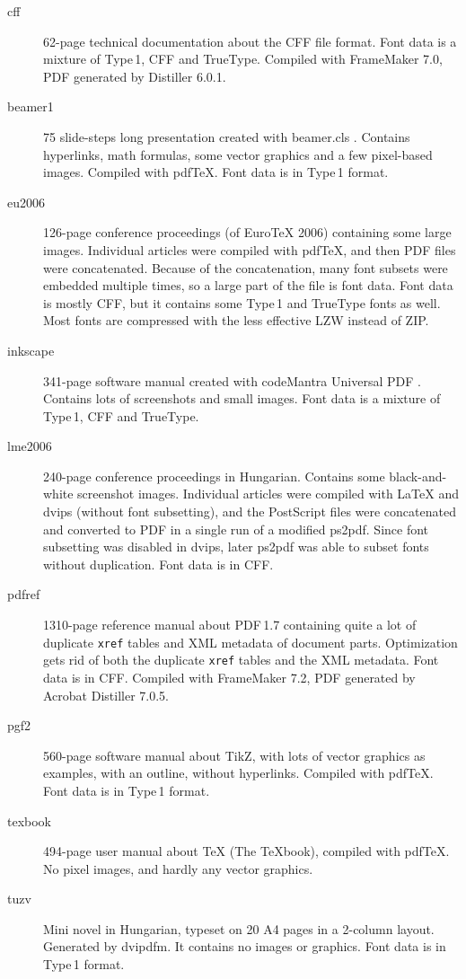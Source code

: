 \documentclass{ltugproc}
\def\cmd{\textsf}
\def\pkg{\textsf}
\begin{document}
\begin{description}

\item[cff] 62-page technical documentation about the CFF file format. Font
data is a mixture of Type\,1, CFF and TrueType. Compiled with Frame\-Maker
7.0, PDF generated by Distiller 6.0.1. 

\item[beamer1] 75 slide-steps long presentation created with
\pkg{beamer.cls} \cite{beamer}. Contains hyperlinks, math formulas, some
vector graphics and a few pixel-based images. Compiled with pdf\TeX{}.
Font data is in Type\,1 format.

\item[eu2006] 126-page conference proceedings (of Euro\-\TeX{} 2006)
containing some large images. Individual articles were compiled with
pdf\TeX{}, and then PDF files were concatenated. Because of the
concatenation, many font subsets were embedded multiple times, so a large
part of the file is font data. Font data is mostly CFF, but it contains some
Type\,1 and TrueType fonts as well. Most fonts are compressed with the
less effective LZW instead of ZIP.

\item[inkscape] 341-page software manual
created with codeMantra Universal PDF \cite{codemantra}.
Contains lots of screenshots and small images.
Font data is a mixture of
Type\,1, CFF and TrueType.

\item[lme2006] 240-page conference proceedings in Hungarian. Contains some
black-and-white screenshot images. Individual articles were compiled with
\LaTeX{} and \cmd{dvips} (without font subsetting), and the PostScript files
were concatenated and converted to PDF in a single run of a modified
\cmd{ps2pdf}. Since font subsetting was disabled in \cmd{dvips}, later
\cmd{ps2pdf} was able to subset fonts without duplication. Font data is in
CFF.

\item[pdfref] 1310-page reference manual about PDF\,1.7 containing quite a
lot of duplicate \texttt{xref} tables and XML metadata of document parts.
Optimization gets rid of both the duplicate \texttt{xref} tables and the XML
metadata. Font data is in CFF. Compiled with FrameMaker 7.2, PDF generated
by Acrobat Distiller 7.0.5.

\item[pgf2] 560-page software manual about TikZ, with lots of vector
graphics as examples, with an outline, without hyperlinks. Compiled with
pdf\-\TeX{}. Font data is in Type\,1 format.

\item[texbook] 494-page user manual about \TeX{} (The \TeX{}book), compiled
with pdf\TeX{}. No pixel images, and hardly any vector graphics.

\item[tuzv] Mini novel in Hungarian, typeset on 20 A4 pages in a 2-column
layout. Generated by \cmd{dvi\-pdfm}. It contains no images or graphics. Font data
is in Type\,1 format.

\end{description}
\end{document}
